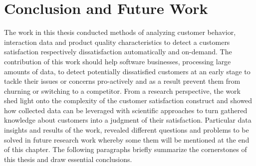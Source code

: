 \chapter{Conclusion and Future Work}
\label{ch:conclusion}

The work in this thesis conducted methods of analyzing customer behavior, interaction data and product quality characteristics to detect a customers satisfaction respectively dissatisfaction automatically and on-demand. The contribution of this work should help software businesses, processing large amounts of data, to detect potentially dissatisfied customers at an early stage to tackle their issues or concerns pro-actively and as a result prevent them from churning or switching to a competitor. From a research perspective, the work shed light onto the complexity of the customer satisfaction construct and showed how collected data can be leveraged with scientific approaches to turn gathered knowledge about customers into a judgment of their satisfaction. Particular data insights and results of the work, revealed different questions and problems to be solved in future research work whereby some them will be mentioned at the end of this chapter. The following paragraphs briefly summarize the cornerstones of this thesis and draw essential conclusions.

